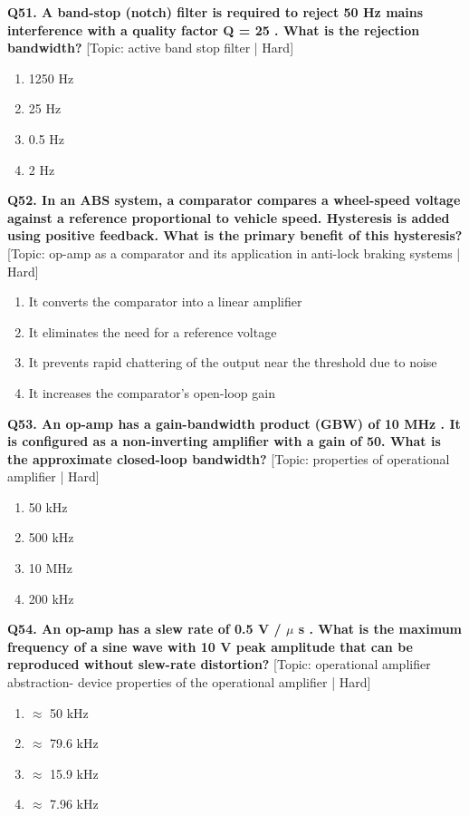 \noindent\textbf{Q51. A band-stop (notch) filter is required to reject 50 Hz mains interference with a quality factor Q = 25 . What is the rejection bandwidth?} \hfill [Topic: active band stop filter | Hard]
\begin{enumerate}[label=(\alph*),topsep=2pt,itemsep=1pt,partopsep=0pt,parsep=0pt]
    \item {1250 Hz}
    \item {25 Hz}
    \item {0.5 Hz}
    \item {2 Hz}
\end{enumerate}
\vspace{2mm}

\noindent\textbf{Q52. In an ABS system, a comparator compares a wheel-speed voltage against a reference proportional to vehicle speed. Hysteresis is added using positive feedback. What is the primary benefit of this hysteresis?} \hfill [Topic: op-amp as a comparator and its application in anti-lock braking systems | Hard]
\begin{enumerate}[label=(\alph*),topsep=2pt,itemsep=1pt,partopsep=0pt,parsep=0pt]
    \item {It converts the comparator into a linear amplifier}
    \item {It eliminates the need for a reference voltage}
    \item {It prevents rapid chattering of the output near the threshold due to noise}
    \item {It increases the comparator's open-loop gain}
\end{enumerate}
\vspace{2mm}

\noindent\textbf{Q53. An op-amp has a gain-bandwidth product (GBW) of 10 MHz . It is configured as a non-inverting amplifier with a gain of 50. What is the approximate closed-loop bandwidth?} \hfill [Topic: properties of operational amplifier | Hard]
\begin{enumerate}[label=(\alph*),topsep=2pt,itemsep=1pt,partopsep=0pt,parsep=0pt]
    \item {50 kHz}
    \item {500 kHz}
    \item {10 MHz}
    \item {200 kHz}
\end{enumerate}
\vspace{2mm}

\noindent\textbf{Q54. An op-amp has a slew rate of 0.5 V / $\mu$ s . What is the maximum frequency of a sine wave with 10 V peak amplitude that can be reproduced without slew-rate distortion?} \hfill [Topic: operational amplifier abstraction- device properties of the operational amplifier | Hard]
\begin{enumerate}[label=(\alph*),topsep=2pt,itemsep=1pt,partopsep=0pt,parsep=0pt]
    \item {$\approx$ 50 kHz}
    \item {$\approx$ 79.6 kHz}
    \item {$\approx$ 15.9 kHz}
    \item {$\approx$ 7.96 kHz}
\end{enumerate}
\vspace{2mm}

